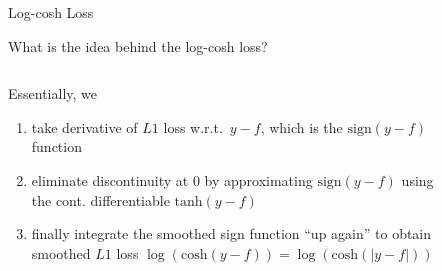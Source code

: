 \documentclass[11pt,compress,t,notes=noshow, xcolor=table]{beamer}
\begin{document}
\begin{vbframe}{Log-cosh Loss }
\framebreak

What is the idea behind the log-cosh loss?
\vspace{-0.3cm}
\begin{columns}

\begin{column}{0.4\textwidth}

{\scriptsize
Essentially, we  
\begin{enumerate}\setlength{\itemsep}{0.32em}
    \item take derivative of $L1$ loss w.r.t.~$y-f$, which is the $\text{sign}(y-f)$ function
    \item eliminate discontinuity at $0$ by approximating $\text{sign}(y-f)$ using the cont. differentiable $\text{tanh}(y-f)$
    \item finally integrate the smoothed sign function ``up again'' to obtain smoothed $L1$ loss $\log(\text{cosh}(y-f))=\log(\text{cosh}(|y-f|))$
\end{enumerate}
}
\end{column}

\begin{column}{0.7\textwidth}

\begin{figure}
      \centering
    \end{figure}

\end{column}


\end{columns}
\end{vbframe}
\end{document}
